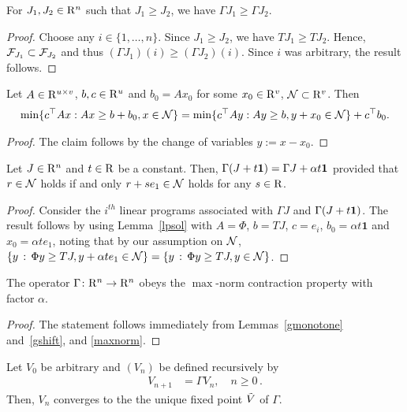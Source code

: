\begin{lemma}\label{gmonotone}
For $J_1, J_2\in \mathrm{R}^n$ such that $J_1\geq J_2$, we have $\Gamma J_1\geq \Gamma J_2$.
\end{lemma}
\begin{proof}
Choose any $i\in \{1,\ldots,n\}$. 
Since $J_1\geq J_2$, we have $TJ_1\geq TJ_2$.
Hence, $\mathcal{F}_{J_1} \subset \mathcal{F}_{J_2}$ and thus $(\Gamma J_1)(i) \ge (\Gamma J_2)(i)$. 
Since $i$ was arbitrary, the result follows.
\end{proof}
\begin{lemma}\label{lpsol}
Let $A\in \mathrm{R}^{u\times v}$, $b,c\in \mathrm{R}^u$ and $b_0=Ax_0$ for 
some $x_0 \in \mathrm{R}^v$, $\mathcal{N} \subset \mathrm{R}^v$. Then
\begin{align}
\min\{c^\top Ax:Ax\geq b+b_0, x\in \mathcal{N}\} =\min\{c^\top A y:Ay \geq b, y+x_0 \in \mathcal{N} \}+c^\top b_0.
\end{align}
\end{lemma}
\begin{proof}
The claim follows by the change of variables $y := x-x_0$.
\end{proof}
\begin{lemma}\label{gshift}
Let $J\in \mathrm{R}^n$ and $t\in \mathrm{R}$ be a constant.
Then, $\Gamma (J+t\mathbf{1}) = \Gamma J + \alpha t \mathbf{1}$ provided that $r\in \mathcal{N}$ holds if and only $r+s e_1\in \mathcal{N}$ holds for any $s\in \mathrm{R}$.
\end{lemma}
\begin{proof}
Consider the $i^{th}$ linear programs associated with $\Gamma J$ and $\Gamma (J+ t\mathbf{1})$. 
The result follows by using Lemma~\ref{lpsol} with $A=\Phi$, $b=TJ$, $c=e_i$, $b_0=\alpha t\mathbf{1}$ 
and $x_0=\alpha t e_1$, noting that by our assumption on $\mathcal{N}$,
$\{ y\,: \, \Phi y \geq TJ, y + \alpha t e_1\in \mathcal{N} \}
= \{ y\,: \, \Phi y \geq TJ, y \in \mathcal{N} \}$. 
\end{proof}
\begin{theorem}\label{gmaxcontra}
The operator $\Gamma  \colon \mathrm{R}^n\rightarrow \mathrm{R}^n$ obeys the $\max$-norm contraction property with factor $\alpha$.
\end{theorem}
\begin{proof}
The statement follows immediately from Lemmas~\ref{gmonotone} and~\ref{gshift}, and \cref{maxnorm}.
\end{proof}
\begin{corollary}
Let $V_0$ be arbitrary and $(V_n)$ be defined recursively by
\begin{align}\label{pvi}
V_{n+1}&=\Gamma V_n, \quad n\geq 0\,.
\end{align}
Then, $V_n$ converges to the the unique fixed point $\tilde{V}$ of $\Gamma$.
\end{corollary}

